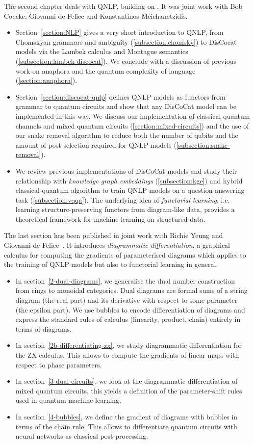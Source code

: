 The second chapter deals with QNLP, building on \cite{MeichanetzidisEtAl20,CoeckeEtAl20,MeichanetzidisEtAl20a}.
It was joint work with Bob Coecke, Giovanni de Felice and Konstantinos Meichanetzidis.
\begin{itemize}
\item Section~\ref{section:NLP} gives a very short introduction to QNLP, from Chomskyan grammars and ambiguity (\ref{subsection:chomsky}) to DisCocat models via the Lambek calculus and Montague semantics (\ref{subsection:lambek-discocat}).
We conclude with a discussion of previous work on anaphora and the quantum complexity of language (\ref{section:anaphora}).
\item Section~\ref{section:discocat-qnlp} defines QNLP models as functors from grammar to quantum circuits and show that any DisCoCat model can be implemented in this way.
We discuss our implementation of classical-quantum channels and mixed quantum circuits (\ref{section:mixed-circuits}) and the use of our snake removal algorithm to reduce both the number of qubits and the amount of post-selection required for QNLP models (\ref{subsection:snake-removal}).
\item We review previous implementations of DisCoCat models and study their relationship with \emph{knowledge graph embeddings} (\ref{subsection:kge}) and  hybrid classical-quantum algorithm to train QNLP models on a question-answering task (\ref{subsection:vqqa}).
The underlying idea of \emph{functorial learning}, i.e. learning structure-preserving functors from diagram-like data, provides a theoretical framework for machine learning on structured data.
\end{itemize}
The last section has been published in joint work with Richie Yeung and Giovanni de Felice~\cite{ToumiEtAl21a}.
It introduces \emph{diagrammatic differentiation}, a graphical calculus for computing the gradients of parameterised diagrams which applies to the training of QNLP models but also to functorial learning in general.
\begin{itemize}
\item In section~\ref{2-dual-diagrams}, we generalise the dual number construction from rings to monoidal categories. Dual diagrams are formal sums of a string diagram (the real part) and its derivative with respect to some parameter (the epsilon part).
We use bubbles to encode differentiation of diagrams and express the standard rules of calculus (linearity, product, chain) entirely in terms of diagrams.
\item In section~\ref{2b-differentiating-zx}, we study diagrammatic differentiation for the ZX calculus.
This allows to compute the gradients of linear maps with respect to phase parameters.
\item In section~\ref{3-dual-circuits}, we look at the diagrammatic differentiation of mixed quantum circuits, this yields a definition of the parameter-shift rules used in quantum machine learning.
\item In section~\ref{4-bubbles}, we define the gradient of diagrams with bubbles in terms of the chain rule. This allows to differentiate quantum circuits with neural networks as classical post-processing.
\end{itemize}

